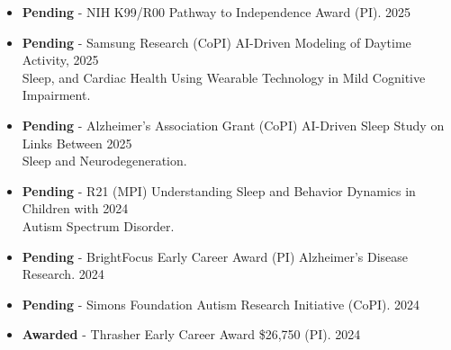 \documentclass[margin, line]{res}
\begin{document}
\begin{resume}
\begin{itemize}
\item \textbf{Pending} - NIH K99/R00 Pathway to Independence Award (PI). \hspace*{\fill} 2025 
\item \textbf{Pending} - Samsung Research (CoPI) AI-Driven Modeling of Daytime Activity,   \hspace*{\fill} 2025 \\ Sleep, and Cardiac Health Using Wearable Technology in Mild Cognitive Impairment. 
\item \textbf{Pending} -  Alzheimer's Association Grant (CoPI) AI-Driven Sleep Study on Links Between  \hspace*{\fill} 2025 \\ Sleep and Neurodegeneration. 
\item \textbf{Pending} - R21 (MPI) Understanding Sleep and Behavior Dynamics in Children with \hspace*{\fill} 2024 \\ Autism Spectrum Disorder. 
\item \textbf{Pending} - BrightFocus Early Career Award (PI) Alzheimer's Disease Research. \hspace*{\fill} 2024 
\item \textbf{Pending} - Simons Foundation Autism Research Initiative (CoPI). \hspace*{\fill} 2024 
\item \textbf{Awarded} - Thrasher Early Career Award \$26,750 (PI). \hspace*{\fill} 2024 
\end{itemize}


\end{resume}
\end{document}
